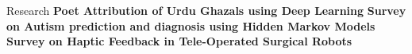 \begin{rubric}{Research}
\entry*\textbf{Poet Attribution of Urdu Ghazals using Deep Learning}
\entry*\textbf{Survey on Autism prediction and diagnosis using Hidden Markov Models}    
\entry*\textbf{Survey on Haptic Feedback in Tele-Operated Surgical Robots}
\end{rubric}